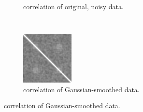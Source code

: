 \begin{figure}[p]
\begin{subfigure}[t]{0.3\textwidth}
    \caption{ correlation of original, noisy data.}
    \label{fig:6dconn2}
    \end{subfigure}
~
  \begin{subfigure}[t]{0.3\textwidth}
    \centering
    \includegraphics[width=\textwidth]{figures/method1/newtoy/SampleCorr}
    \caption{correlation of Gaussian-smoothed data.}
    \label{fig:6dconn3}
    \end{subfigure}


\end{figure}
